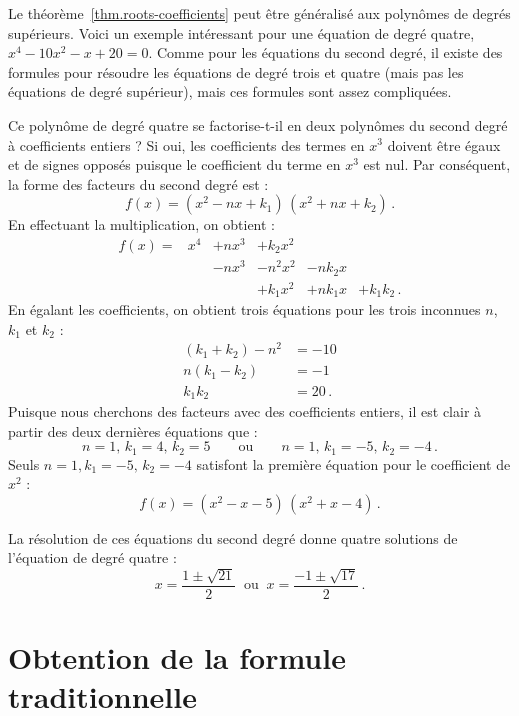 \begin{example}
Le théorème~\ref{thm.roots-coefficients} peut être généralisé aux polynômes de degrés supérieurs. Voici un exemple intéressant pour une équation de degré quatre,  $x^4-10x^2-x+20=0$. Comme pour les équations du second degré, il existe des formules pour résoudre les équations de degré trois et quatre (mais pas les équations de degré supérieur), mais ces formules sont assez compliquées.

Ce polynôme de degré quatre se factorise-t-il en deux polynômes du second degré à coefficients entiers ? Si oui, les coefficients des termes en $x^3$ doivent être égaux et de signes opposés puisque le coefficient du terme en $x^3$ est nul. Par conséquent, la forme des facteurs du second degré est :
\[
f(x) = (x^2 - nx + k_1)\, (x^2 + nx + k_2)\,.
\]
En effectuant la multiplication, on obtient :
\[
\renewcommand{\arraystretch}{1.1}
\begin{array}{rrrrrr}
f(x) = &x^4 & + nx^3 & + k_2 x^2\\
&& -nx^3 &- n^2x^2 &-nk_2x\\
&&&+k_1x^2 &+ nk_1x &+ k_1k_2\,.
\end{array}
\]
En égalant les coefficients, on obtient trois équations pour les trois inconnues $n$, $k_1$ et $k_2$ :
\begin{align*}
(k_1+k_2)-n^2 &= -10\\
n(k_1-k_2) &= -1\\
k_1k_2 &= 20\,.
\end{align*}
Puisque nous cherchons des facteurs avec des coefficients entiers,  il est clair à partir des deux dernières équations que :
\[
n=1,\,k_1=4,\,k_2=5  \quad\quad\textrm{ou} \quad\quad n=1,\,k_1=-5,\, k_2=-4\,.
\]
Seuls $n=1,k_1=-5,\, k_2=-4$ satisfont la première équation pour le coefficient de $x^2$ :
\[
f(x) = (x^2 - x - 5)\, (x^2 + x - 4)\,.
\]



La résolution de ces équations du second degré donne quatre solutions de l'équation de degré quatre :
\[
x = \frac{1\pm\sqrt{21}}{2}  \;\;\textrm{ou} \;\; x= \frac{-1\pm\sqrt{17}}{2} \,.
\]
\end{example}

\section{Obtention de la formule traditionnelle}\label{s.general}

